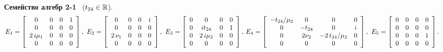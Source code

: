 {\bf Семейство алгебр 2-1} \ ($ t_{24} \in \Bbb R $).
\begin{equation}
 E_1 =
\left[ \begin {array}{cccc} 0&0&0&1\\
0&0&0 &0\\
2\,i \mu_1 &0&0&0 \\
0&0&0&0\end {array} \right]
,\
E_2 =
\left[ \begin {array}{cccc}
0&0&0&i\\
0&0&0 &0\\
2\,\nu_1 &0&0&0 \\
0&0&0&0\end {array} \right]
,\
E_3 =
\left[ \begin {array}{cccc} 0&0&0&0\\
0&it_{{24}}&0 &1\\
0&2\,i \mu_2 &0&0 \\
0&0&0&0\end {array} \right]
,\
$$
$$
E_4 =
 \left[ \begin {array}{cccc} - t_{{24}}/{\mu_2} &0&0&0\\
0&-t_{{24}}&0&i\\
0&2\nu_2 &-2\,t_{{24}}/{\mu_2}&0 \\
0&0&0&0\end {array} \right]
,\
E_5 =
\left[ \begin {array}{cccc} 0&0&0&0\\
0&0&0 &0\\
0&0&0&1 \\
0&0&0&0\end {array} \right].
\end{equation}


